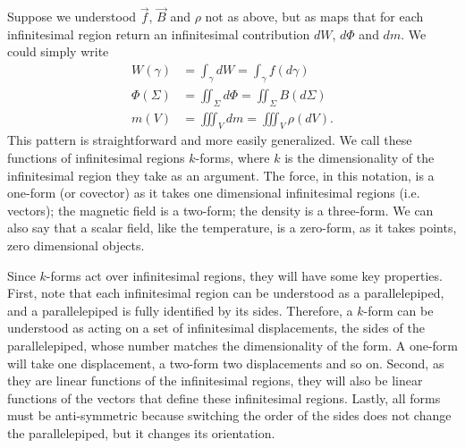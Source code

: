 Suppose we understood $\vec{f}$, $\vec{B}$ and $\rho$ not as above, but as maps that for each infinitesimal region return an infinitesimal contribution $dW$, $d\Phi$ and $dm$. We could simply write
\begin{equation*}
	\begin{aligned}
		W(\gamma) &= \int_\gamma dW = \int_\gamma f(d\gamma) \\
		\Phi(\Sigma) &= \iint_\Sigma d\Phi = \iint_\Sigma B(d\Sigma) \\
		m(V) &= \iiint_V dm = \iiint_V \rho(dV).
	\end{aligned}
\end{equation*}
This pattern is straightforward and more easily generalized. We call these functions of infinitesimal regions $k$-forms, where $k$ is the dimensionality of the infinitesimal region they take as an argument. The force, in this notation, is a one-form (or covector) as it takes one dimensional infinitesimal regions (i.e. vectors); the magnetic field is a two-form; the density is a three-form. We can also say that a scalar field, like the temperature, is a zero-form, as it takes points, zero dimensional objects.

Since $k$-forms act over infinitesimal regions, they will have some key properties.  First, note that each infinitesimal region can be understood as a parallelepiped, and a parallelepiped is fully identified by its sides. Therefore, a $k$-form can be understood as acting on a set of infinitesimal displacements, the sides of the parallelepiped, whose number matches the dimensionality of the form. A one-form will take one displacement, a two-form two displacements and so on. Second, as they are linear functions of the infinitesimal regions, they will also be linear functions of the vectors that define these infinitesimal regions. Lastly, all forms must be anti-symmetric because switching the order of the sides does not change the parallelepiped, but it changes its orientation.

